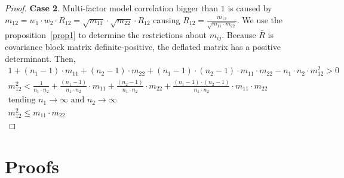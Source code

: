 \documentclass[11pt,fleqn]{book} %
\begin{document}
\begin{proof}
	\textbf{Case 2}. Multi-factor model correlation bigger than $1$ is caused
	by $m_{12} = w_1 \cdot w_2 \cdot R_{12} = \sqrt{m_{11}} \cdot \sqrt{m_{22}} \cdot R_{12}$
	causing $R_{12} = \frac{m_{12}}{\sqrt{m_{11} \cdot m_{22}}}$.
	We use the proposition~\ref{prop1} to determine the restrictions about $m_{ij}$. 
	Because $\bar{R}$ is covariance block matrix definite-positive, the deflated 
	matrix has a positive determinant. Then,
	\begin{displaymath}
		\begin{array}{l}
			1 + (n_1-1) \cdot m_{11} + (n_2-1) \cdot m_{22} +                     
			(n_1-1) \cdot (n_2-1) \cdot m_{11} \cdot m_{22} -                     
			n_1 \cdot n_2 \cdot m_{12}^2 > 0                                      
			                                                                      \\
			m_{12}^2 <                                                            
			\frac{1}{n_1 \cdot n_2} +                                             
			\frac{(n_1-1)}{n_1 \cdot n_2} \cdot m_{11} +                          
			\frac{(n_2-1)}{n_1 \cdot n_2} \cdot m_{22} +                          
			\frac{(n_1-1) \cdot (n_2-1)}{n_1 \cdot n_2} \cdot m_{11} \cdot m_{22} 
			                                                                      \\
			\text{tending } n_1 \to \infty \text{ and } n_2 \to \infty            
			                                                                      \\
			m_{12}^2 \le m_{11} \cdot m_{22}                                      
		\end{array}
	\end{displaymath}
\end{proof}


\chapter{Proofs}

\section{}
\end{document}
